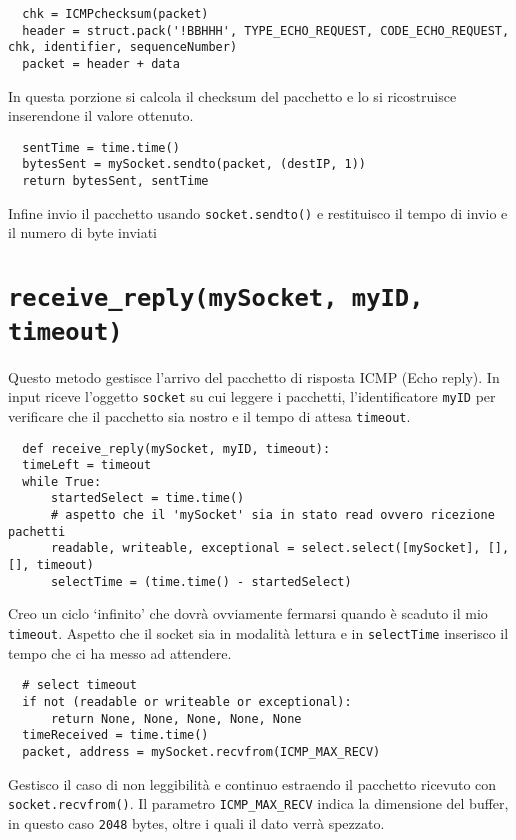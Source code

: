 \documentclass[a4paper,12pt]{report}
\begin{document}
\begin{verbatim}
  chk = ICMPchecksum(packet)
  header = struct.pack('!BBHHH', TYPE_ECHO_REQUEST, CODE_ECHO_REQUEST, chk, identifier, sequenceNumber)
  packet = header + data
\end{verbatim}
In questa porzione si calcola il checksum del pacchetto e lo si ricostruisce inserendone il valore ottenuto.
\begin{verbatim}
  sentTime = time.time()
  bytesSent = mySocket.sendto(packet, (destIP, 1))
  return bytesSent, sentTime
\end{verbatim}
Infine invio il pacchetto usando \texttt{socket.sendto()} e restituisco il tempo di invio e il numero di byte inviati
\section{\texttt{receive\_reply(mySocket, myID, timeout)}}
Questo metodo gestisce l'arrivo del pacchetto di risposta ICMP (Echo reply).
%
In input riceve l'oggetto \texttt{socket} su cui leggere i pacchetti, l'identificatore \texttt{myID} per verificare che il pacchetto sia nostro e il tempo di attesa \texttt{timeout}.
%
\begin{verbatim}
  def receive_reply(mySocket, myID, timeout):
  timeLeft = timeout
  while True:
      startedSelect = time.time()
      # aspetto che il 'mySocket' sia in stato read ovvero ricezione pachetti
      readable, writeable, exceptional = select.select([mySocket], [], [], timeout)
      selectTime = (time.time() - startedSelect)
\end{verbatim}
Creo un ciclo `infinito' che dovrà ovviamente fermarsi quando è scaduto il mio \texttt{timeout}.
%
Aspetto che il socket sia in modalità lettura e in \texttt{selectTime} inserisco il tempo che ci ha messo ad attendere.
\begin{verbatim}
  # select timeout
  if not (readable or writeable or exceptional):
      return None, None, None, None, None 
  timeReceived = time.time()
  packet, address = mySocket.recvfrom(ICMP_MAX_RECV)
\end{verbatim}
Gestisco il caso di non leggibilità e continuo estraendo il pacchetto ricevuto con \texttt{socket.recvfrom()}.
%
Il parametro \texttt{ICMP\_MAX\_RECV} indica la dimensione del buffer, in questo caso \texttt{2048} bytes, oltre i quali il dato verrà spezzato.
\end{document}
